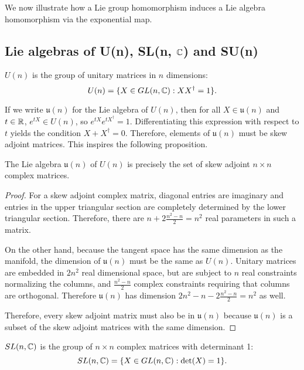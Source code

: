 \documentclass[a4paper]{article}
\begin{document}
We now illustrate how a Lie group homomorphism induces a Lie algebra homomorphism via the exponential map.

\subsection{Lie algebras of U(n), SL(n, \texorpdfstring{$\mathbb{C}$}{C}) and SU(n)}

\begin{defi}[U(n)]
    $U(n)$ is the group of unitary matrices in $n$ dimensions: 
    $$U(n) = \{X \in GL(n, \mathbb{C}) : XX^\dagger = 1\}.$$
\end{defi}
If we write $\mathfrak{u}(n)$ for the Lie algebra of $U(n)$, then for all $X \in \mathfrak{u}(n)$ and $t \in \mathbb{R}$, $e^{tX} \in U(n)$, so $e^{tX}e^{tX^\dagger} = 1$. Differentiating this expression with respect to $t$ yields the condition $X + X^\dagger = 0$. Therefore, elements of $\mathfrak{u}(n)$ must be skew adjoint matrices. This inspires the following proposition. 

\begin{prop}
    The Lie algebra $\mathfrak{u}(n)$ of $U(n)$ is precisely the set of skew adjoint $n \times n$ complex matrices.
\end{prop}

\begin{proof}
    For a skew adjoint complex matrix, diagonal entries are imaginary and entries in the upper triangular section are completely determined by the lower triangular section. Therefore, there are $n + 2 \frac{n^2 - n }{2} = n^2$ real parameters in such a matrix.

    On the other hand, because the tangent space has the same dimension as the manifold, the dimension of $\mathfrak{u}(n)$ must be the same as $U(n)$. Unitary matrices are embedded in $2n^2$ real dimensional space, but are subject to $n$ real constraints normalizing the columns, and $\frac{n^2 - n }{2}$ complex constraints requiring that columns are orthogonal. Therefore $\mathfrak{u}(n)$ has dimension $2n^2 - n - 2 \frac{n^2 - n }{2} = n^2$ as well. 
    
    Therefore, every skew adjoint matrix must also be in $\mathfrak{u}(n)$ because $\mathfrak{u}(n)$ is a subset of the skew adjoint matrices with the same dimension.
\end{proof}

\begin{defi}[$SL(n, \C)$]
    $SL(n, \C)$ is the group of $n\times n$ complex matrices with determinant 1:
    $$SL(n, \mathbb{C}) = \{X \in GL(n, \mathbb{C}) : \det(X) = 1\}.$$
\end{defi}
\end{document}
